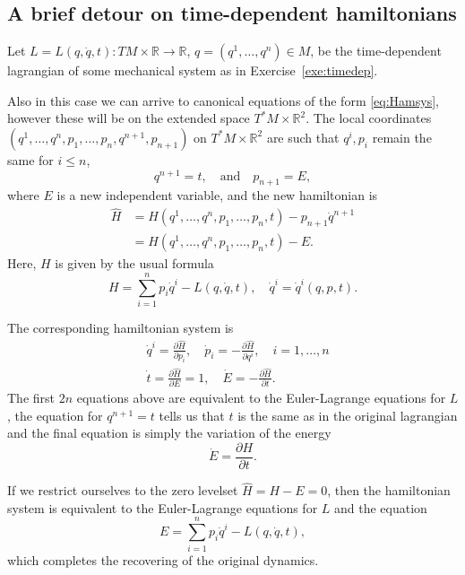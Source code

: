 \documentclass[english,fontsize=11pt,paper=a5,oneside]{scrbook}
\newcommand{\R}{\mathbb{R}}
\theoremstyle{definition}
\begin{document}
\subsection{A brief detour on time-dependent hamiltonians}\label{sec:timedepH}

Let $L=L(q,\dot q,t): TM\times\R\to\R$, $q=(q^1,\ldots,q^n)\in M$, be the time-dependent lagrangian of some mechanical system as in Exercise~\ref{exe:timedep}.

Also in this case we can arrive to canonical equations of the form \eqref{eq:Hamsys}, however these will be on the extended space $T^*M\times\R^2$. The local coordinates $(q^1,\ldots,q^n, p_1, \ldots,p_n, q^{n+1}, p_{n+1})$ on $T^*M\times\R^2$ are such that $q^i, p_i$ remain the same for $i\leq n$,
\begin{equation}
  q^{n+1} = t, \quad\mbox{and}\quad
  p_{n+1} = E,
\end{equation}
where $E$ is a new independent variable, and the new hamiltonian is
\begin{align}
  \hat H & = H(q^1, \ldots, q^n, p_1, \ldots, p_n, t) - p_{n+1}\dot q^{n+1} \\
         & = H(q^1, \ldots, q^n, p_1, \ldots, p_n, t) - E.
\end{align}
Here, $H$ is given by the usual formula
\begin{equation}
  H = \sum_{i=1}^n p_i \dot q^i - L(q, \dot q, t), \quad \dot q^i = \dot q^i(q,p,t).
\end{equation}

The corresponding hamiltonian system is
\begin{align}
   & \dot q^i = \frac{\partial \hat H}{\partial p_i}, \quad
  \dot p_i = -\frac{\partial \hat H}{\partial q^i}, \quad
  i=1,\ldots,n                                                                                              \\
   & \dot t = \frac{\partial \hat H}{\partial E} = 1, \quad {\dot E} = -\frac{\partial \hat H}{\partial t}.
\end{align}
The first $2n$ equations above are equivalent to the Euler-Lagrange equations for $L$, the equation for $q^{n+1} = t$ tells us that $t$ is the same as in the original lagrangian and the final equation is simply the variation of the energy
\begin{equation}
  \dot E = \frac{\partial H}{\partial t}.
\end{equation}

If we restrict ourselves to the zero levelset $\hat H = H - E = 0$, then the hamiltonian system is equivalent to the Euler-Lagrange equations for $L$ and the equation
\begin{equation}
  E = \sum_{i=1}^n p_i \dot q^i - L(q, \dot q, t),
\end{equation}
which completes the recovering of the original dynamics.
\end{document}
